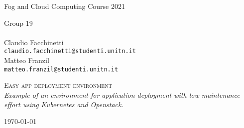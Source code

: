 \pagestyle{plain}

\thispagestyle{empty}

\begin{center}
  \begin{figure}[h!]
    \centerline{}
  \end{figure}

  \vspace{0.7 cm}

  \LARGE{Fog and Cloud Computing Course 2021\\}

  \vspace{1 cm}
  \Large{
    Group 19 \\
    \hphantom{abcdefg} \\
    Claudio Facchinetti \\
    \texttt{claudio.facchinetti@studenti.unitn.it}\\
    Matteo Franzil\\
    \texttt{matteo.franzil@studenti.unitn.it}
  }

  \vspace{3 cm}
  \Huge\textsc{Easy app deployment environment\\}
  \Large{\it{Example of an environment for application deployment with low maintenance effort using Kubernetes and Openstack.}}

  \vspace{8 cm}

  \Large{\today}

\end{center}